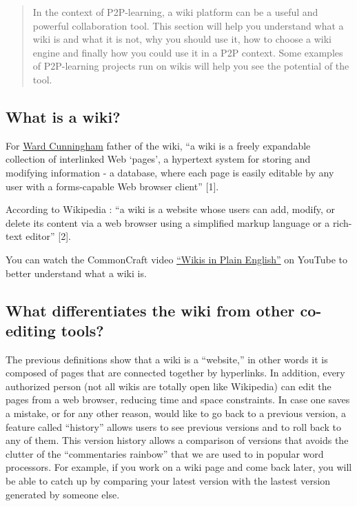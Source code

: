 \begin{quote}
In the context of P2P-learning, a wiki platform can be a useful and
powerful collaboration tool. This section will help you understand what
a wiki is and what it is not, why you should use it, how to choose a
wiki engine and finally how you could use it in a P2P context. Some
examples of P2P-learning projects run on wikis will help you see the
potential of the tool.
\end{quote}

\hypertarget{what-is-a-wiki}{%
\subsection{What is a wiki?}\label{what-is-a-wiki}}

For \href{http://en.wikipedia.org/wiki/Ward_cunningham}{Ward Cunningham}
father of the wiki, ``a wiki is a freely expandable collection of
interlinked Web `pages', a hypertext system for storing and modifying
information - a database, where each page is easily editable by any user
with a forms-capable Web browser client'' {{[}1{]}}.

According to Wikipedia : ``a wiki is a website whose users can add,
modify, or delete its content via a web browser using a simplified
markup language or a rich-text editor'' {{[}2{]}}.

You can watch the CommonCraft video
\href{http://www.youtube.com/watch?v=-dnL00TdmLY}{``Wikis in Plain
English''} on YouTube to better understand what a wiki is.

\hypertarget{what-differentiates-the-wiki-from-other-co-editing-tools}{%
\subsection{What differentiates the wiki from other co-editing
tools?}\label{what-differentiates-the-wiki-from-other-co-editing-tools}}

The previous definitions show that a wiki is a ``website,'' in other
words it is composed of pages that are connected together by hyperlinks.
In addition, every authorized person (not all wikis are totally open
like Wikipedia) can edit the pages from a web browser, reducing time and
space constraints. In case one saves a mistake, or for any other reason,
would like to go back to a previous version, a feature called
``history'' allows users to see previous versions and to roll back to
any of them. This version history allows a comparison of versions that
avoids the clutter of the ``commentaries rainbow'' that we are used to
in popular word processors. For example, if you work on a wiki page and
come back later, you will be able to catch up by comparing your latest
version with the lastest version generated by someone else.


